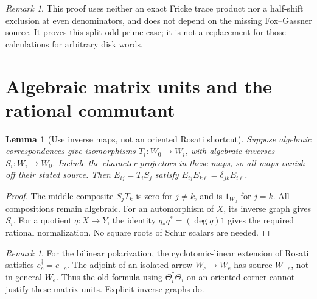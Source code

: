 \documentclass[11pt]{article}
\newtheorem{lemma}[theorem]{Lemma}
\theoremstyle{remark}
\newtheorem{remark}[theorem]{Remark}
\begin{document}
\begin{remark}
This proof uses neither an exact Fricke trace product nor a
half-shift exclusion at even denominators, and does not depend on
the missing Fox--Gassner source.  It proves this split odd-prime case;
it is not a replacement for those calculations for arbitrary disk words.
\end{remark}

\section{Algebraic matrix units and the rational commutant}
\begin{lemma}[Use inverse maps, not an oriented Rosati shortcut]\label{lem:units}
Suppose algebraic correspondences give isomorphisms
\(T_i:W_0\longrightarrow W_i\), with algebraic inverses
\(S_i:W_i\longrightarrow W_0\).  Include the character projectors in
these maps, so all maps vanish off their stated source.  Then
\(E_{ij}=T_iS_j\) satisfy \(E_{ij}E_{k\ell}=\delta_{jk}E_{i\ell}\).
\end{lemma}
\begin{proof}
The middle composite \(S_jT_k\) is zero for \(j\neq k\), and is
\(1_{W_0}\) for \(j=k\).  All compositions remain algebraic.
For an automorphism of \(X\), its inverse graph gives \(S_i\).
For a quotient \(q:X\to Y\), the identity
\(q_*q^*=(\deg q)1\) gives the required rational normalization.
No square roots of Schur scalars are needed.
\end{proof}

\begin{remark}
For the bilinear polarization, the cyclotomic-linear extension of
Rosati satisfies \(e_c^\dagger=e_{-c}\).  The adjoint of an isolated
arrow \(W_c\to W_e\) has source \(W_{-e}\), not in general \(W_e\).
Thus the old formula using \(\Theta_i^\dagger\Theta_i\) on an oriented
corner cannot justify these matrix units.  Explicit inverse graphs do.
\end{remark}
\end{document}
